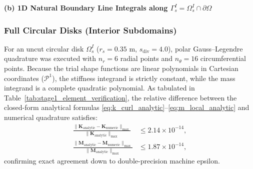 \documentclass[VANCOUVER,Times1COL]{WileyNJD-v5}
\begin{document}
\begin{table}[!t]
    \vspace{0.8em}
    \textbf{(b) 1D Natural Boundary Line Integrals along $\Gamma_s^I = \Omega_s^I \cap \partial\Omega$}
    \vspace{0.2em}

\end{table}

\subsubsection{Full Circular Disks (Interior Subdomains)}
For an uncut circular disk $\Omega_s^I$ ($r_s = 0.35\text{ m}$, $s_{\mathrm{div}} = 4.0$), polar Gauss--Legendre quadrature was executed with $n_r = 6$ radial points and $n_\theta = 16$ circumferential points. Because the trial shape functions are linear polynomials in Cartesian coordinates ($\mathcal{P}^1$), the stiffness integrand is strictly constant, while the mass integrand is a complete quadratic polynomial. As tabulated in Table~\ref{tab:stage1_element_verification}, the relative difference between the closed-form analytical formulas \eqref{eq:k_curl_analytic}--\eqref{eq:m_local_analytic} and numerical quadrature satisfies:
\begin{align}
    \frac{\|\mathbf{K}_{\mathrm{analytic}} - \mathbf{K}_{\mathrm{numeric}}\|_{\max}}{\|\mathbf{K}_{\mathrm{analytic}}\|_{\max}} & \le 2.14 \times 10^{-14}, \\
    \frac{\|\mathbf{M}_{\mathrm{analytic}} - \mathbf{M}_{\mathrm{numeric}}\|_{\max}}{\|\mathbf{M}_{\mathrm{analytic}}\|_{\max}} & \le 1.87 \times 10^{-14},
\end{align}
confirming exact agreement down to double-precision machine epsilon.
\end{document}
